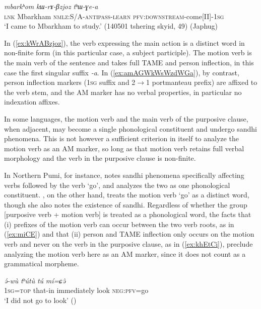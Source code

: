 \documentclass[oneside,a4paper,11pt]{article}
\newcommand{\ipa}[1]{{\phon\textit{#1}}}
\begin{document}
\begin{exe}
\ex \label{ex:kWrABzjoz}
 \gll \ipa{tɕe} \ipa{mbarkʰom} \ipa{kɯ-rɤ-βzjoz} \ipa{tʰɯ-ɣe-a} \\
\textsc{lnk} Mbarkham \textsc{nmlz}:S/A-\textsc{antipass}-\textsc{learn} \textsc{pfv}:\textsc{downstream}-come[II]-\textsc{1sg} \\
 \glt `I came to Mbarkham to study.' (140501 tshering skyid, 49) (Japhug)
 \end{exe}
 
In (\ref{ex:kWrABzjoz}), the verb expressing the main action is a distinct word in non-finite form (in this particular case, a subject participle).  The motion verb is the main verb of the sentence and takes full TAME and person inflection, in this case the first singular suffix \ipa{-a}. In (\ref{ex:amAGWkWsWzdWGa}), by contrast, person inflection markers (\textsc{1sg} suffix and 2$\rightarrow$1 portmanteau prefix) are affixed to the verb stem, and the AM marker has no verbal properties, in particular no indexation affixes.

In some languages, the motion verb and the main verb of the purposive clause, when adjacent, may become a single phonological constituent and undergo sandhi phenomena. This is not however a sufficient criterion in itself to analyze the motion verb as an AM marker, so long as that motion verb retains full verbal morphology and the verb in the purposive clause is non-finite.

In Northern Pumi, for instance, \citet[§ 5.2]{jacques11pumi.tone} notes sandhi phenomena specifically affecting verbs followed by the verb `go', and analyzes the two as one phonological constituent. \citet{daudey14grammar}, on the other hand, treats the motion verb `go' as a distinct word, though she also notes the existence of sandhi. Regardless of whether the group [purposive verb + motion verb] is treated as a phonological word, the facts that (i) prefixes of the motion verb can occur between the two verb roots, as in (\ref{ex:miCE}) and that (ii) person and TAME inflection only occurs on the motion verb and never on the verb in the purposive clause, as in (\ref{ex:khEtCi}), preclude analyzing the motion verb here as an AM marker, since it does not count as a grammatical morpheme.
 

\begin{exe}
\ex \label{ex:miCE}
 \gll   \ipa{ɐ́=bú} \ipa{ə́-wù}  \ipa{tʰútù} \ipa{tú} \ipa{mí=ɕə̂} \\
 \textsc{1sg}=\textsc{top} that-in   immediately look \textsc{neg}:\textsc{pfv}=go \\
 \glt ‘I did not go to look' (\citealt[364]{daudey14grammar})
\end{exe}
\end{document}
